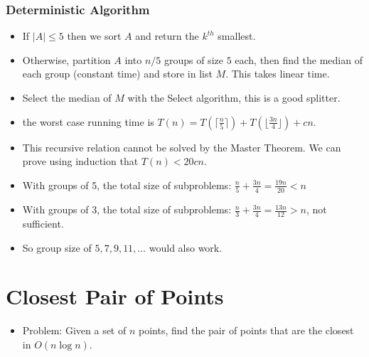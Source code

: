 \documentclass[a4paper,12pt]{article}
\begin{document}
\subsubsection{Deterministic Algorithm}
\begin{itemize}
    \item If $|A|\leq 5$ then we sort $A$ and return the $k^{th}$ smallest.
    \item Otherwise, partition $A$ into $n/5$ groups of size $5$ each, then find the median of each group (constant time) and store in list $M$. This takes linear time.
    \item Select the median of $M$ with the Select algorithm, this is a good splitter.
    \item the worst case running time is $T(n)=T(\lceil\frac{n}{5}\rceil)+T(\lfloor{\frac{3n}{4}}\rfloor)+cn$.
    \item This recursive relation cannot be solved by the Master Theorem. We can prove using induction that $T(n)<20cn$.
\end{itemize}
\begin{itemize}
    \item With groups of 5, the total size of subproblems: $\frac{n}{5}+\frac{3n}{4}=\frac{19n}{20}<n$
    \item With groups of 3, the total size of subproblems: $\frac{n}{3}+\frac{3n}{4}=\frac{13n}{12}>n$, not sufficient.
    \item So group size of $5,7,9,11,\dots$ would also work.
\end{itemize}

\section{Closest Pair of Points}
\begin{itemize}
    \item Problem: Given a set of $n$ points, find the pair of points that are the closest in $O(n\log n)$.
\end{itemize}
\end{document}

